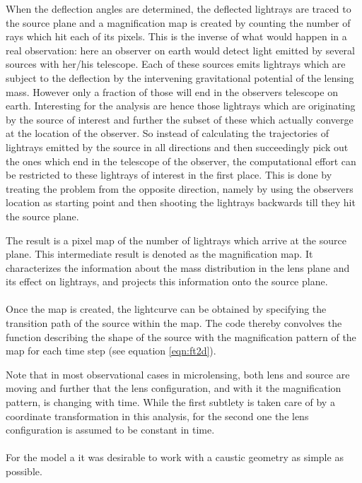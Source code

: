 When the deflection angles are determined, the deflected lightrays are traced to the source plane and a magnification map is created by counting the number of rays which hit each of its pixels. This is the inverse of what would happen in a real observation: here an observer on earth would detect light emitted by several sources with her/his telescope. Each of these sources emits lightrays which are subject to the deflection by the intervening gravitational potential of the lensing mass. However only a fraction of those will end in the observers telescope on earth. Interesting for the analysis are hence those lightrays which are originating by the source of interest and further the subset of these which actually converge at the location of the observer. So instead of calculating the trajectories of lightrays emitted by the source in all directions and then succeedingly pick out the ones which end in the telescope of the observer, the computational effort can be restricted to these lightrays of interest in the first place. This is done by treating the problem from the opposite direction, namely by using the observers location as starting point and then shooting the lightrays backwards till they hit the source plane. 

The result is a pixel map of the number of lightrays which arrive at the source plane. This intermediate result is denoted as the magnification map. It characterizes the information about the mass distribution in the lens plane and its effect on lightrays, and projects this information onto the source plane. \\\\
Once the map is created, the lightcurve can be obtained by specifying the transition path of the source within the map. The code thereby convolves the function describing the shape of the source with the magnification pattern of the map for each time step (see equation \ref{eqn:ft2d}).

 Note that in most observational cases in microlensing, both lens and source are moving and further that the lens configuration, and with it the magnification pattern, is changing with time. While the first subtlety is taken care of by a coordinate transformation in this analysis, for the second one the lens configuration is assumed to be constant in time.  \\\\
For the model a it was desirable to work with a caustic geometry as simple as possible. 


